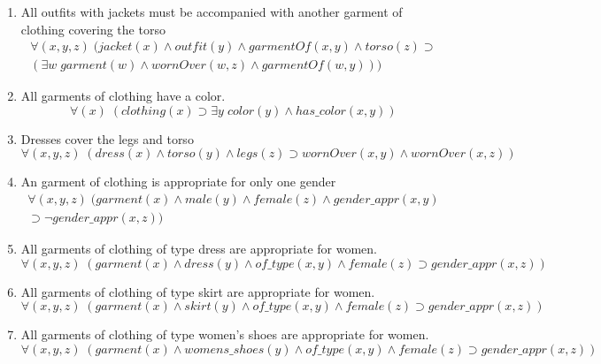 \documentclass[paper=a4, fontsize=11pt]{scrartcl} %
\numberwithin{equation}{section} %
\numberwithin{figure}{section} %
\numberwithin{table}{section} %
\begin{document}
\begin{enumerate}
\item All outfits with jackets must be accompanied with another garment of clothing covering the torso
\begin{equation*}
	\begin{split}
	\forall(x,y,z) \; (jacket(x) \land outfit(y) \land garmentOf(x,y) \land torso(z) \supset \\ (\exists w \; garment(w) \land wornOver(w,z) \land garmentOf(w,y)))
	\end{split}
\end{equation*}

\item All garments of clothing have a color.
\begin{equation*}
	\forall(x) \; (clothing(x) \supset \exists y \; color(y) \land has\_color (x,y))
\end{equation*}

\item Dresses cover the legs and torso
\begin{equation*}
	\forall(x,y,z) \; (dress(x) \land torso(y) \land legs(z) \supset wornOver(x,y) \land wornOver(x,z))
\end{equation*}

\item An garment of clothing is appropriate for only one gender
\begin{equation*}
	\begin{split}
	\forall(x,y,z) \; (garment(x) \land male(y) \land female(z) \land gender\_appr(x,y) \\ \supset \lnot gender\_appr(x,z))
	\end{split}
\end{equation*}

\item All garments of clothing of type dress are appropriate for women.
\begin{equation*}
	\forall(x,y,z) \; (garment(x) \land dress(y) \land of\_type(x,y) \land female(z) \supset gender\_appr(x,z)) 
\end{equation*}

\item All garments of clothing of type skirt are appropriate for women.
\begin{equation*}
	\forall(x,y,z) \; (garment(x) \land skirt(y) \land of\_type(x,y) \land female(z) \supset gender\_appr(x,z)) 
\end{equation*}

\item All garments of clothing of type women's shoes are appropriate for women.
\begin{equation*}
	\forall(x,y,z) \; (garment(x) \land womens\_shoes(y) \land of\_type(x,y) \land female(z) \supset gender\_appr(x,z)) 
\end{equation*}


\end{enumerate}
\end{document}
